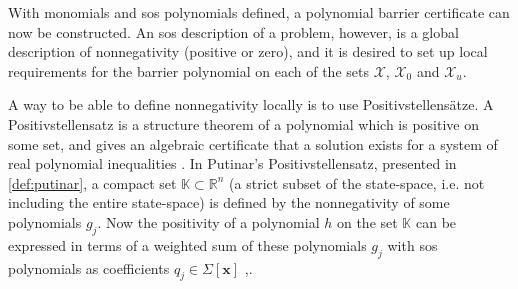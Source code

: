 With monomials and \gls{sos} polynomials defined, a polynomial barrier certificate can now be constructed. An \gls{sos} description of a problem, however, is a global description of nonnegativity (positive or zero), and it is desired to set up local requirements for the barrier polynomial on each of the sets $\mathcal{X}$, $\mathcal{X}_0$ and $\mathcal{X}_u$. %

A way to be able to define nonnegativity locally is to use Positivstellens\"atze.
A Positivstellensatz is a structure theorem of a  polynomial which is positive on some set, and gives an algebraic certificate that a solution exists for a system of real polynomial inequalities \citep{bib:positivstellensatz}. 
In Putinar's Positivstellensatz, presented in \autoref{def:putinar}, a compact set $\mathbb{K}\subset\mathbb{R}^n$ (a strict subset of the state-space, i.e. not including the entire state-space) is defined by the nonnegativity of some polynomials $g_j$.
Now the positivity of a polynomial $h$ on the set $\mathbb{K}$ can be expressed in terms of a weighted sum of these polynomials $g_j$ with \gls{sos} polynomials as coefficients $q_j\in\Sigma[\mathbf{x}]$ \citep[pp 184-186]{bib:sos_putinar_laurent},\citep[pp 28-29]{bib:sos_putinar_lasserre}.\\

